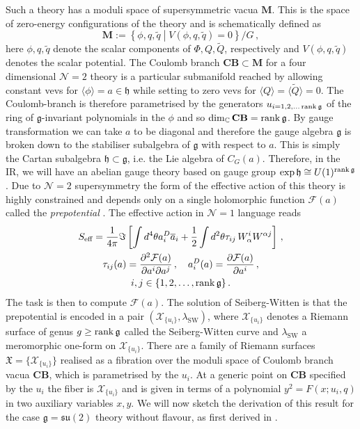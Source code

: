 \documentclass[main.tex]{subfiles}
\begin{document}
Such a theory has a moduli space of supersymmetric vacua $\mathbf{M}$.  This is the space of zero-energy configurations of the theory and is schematically defined as
\begin{equation}\label{eqn:Modspacedef}
\mathbf{M}:=\left\{\phi,q,\widetilde{q}\middle|V(\phi,q,\widetilde{q})=0\right\}/G\,,
\end{equation}
here $\phi,q,\widetilde{q}$ denote the scalar components of $\Phi,Q,\widetilde{Q}$, respectively and $V(\phi,q,\widetilde{q})$ denotes the scalar potential.
The Coulomb branch $\mathbf{CB}\subset \mathbf{M}$ for a four dimensional $\mathcal{N}=2$ theory is a particular submanifold reached by allowing constant vevs for $\langle\phi\rangle=a\in\mathfrak{h}$ while setting to zero vevs for $\langle Q\rangle=\langle\widetilde{Q}\rangle=0$.  The Coulomb-branch is therefore parametrised by the generators $u_{i=1,2,\dots\operatorname{rank}\mathfrak{g}}$ of the ring of $\mathfrak{g}$-invariant polynomials in the $\phi$ and so $\dim_{\mathbb{C}} \mathbf{CB}=\operatorname{rank}\mathfrak{g}$.  By gauge transformation we can take $a$ to be diagonal and therefore the gauge algebra $\mathfrak{g}$ is broken down to the stabiliser subalgebra of $\mathfrak{g}$ with respect to $a$.  This is simply the Cartan subalgebra $\mathfrak{h}\subset\mathfrak{g}$, i.e.  the Lie algebra of $C_{G}(a)$.  Therefore, in the IR, we will have an abelian gauge theory based on gauge group $\exp\mathfrak{h}\cong U(1)^{\operatorname{rank}\mathfrak{g}}$.  Due to $\mathcal{N}=2$ supersymmetry the form of the effective action of this theory is highly constrained and depends only on a single holomorphic function $\mathcal{F}(a)$ called the \textit{prepotential} \cite{1988PhLB..206...75S}.  The effective action in $\mathcal{N}=1$ language reads
\begin{gather}
S_{\text{eff}}=\frac{1}{4\pi}\Im\left[\int d^4\theta a^D_i\overline{a}_i+\frac{1}{2}\int d^2\theta\tau_{ij}\,W_{\alpha}^iW^{\alpha j}\right]\,,\\
 \tau_{ij}(a)=\frac{\partial^2\mathcal{F}(a)}{\partial a^i\partial a^j}\,,\quad a^D_i(a)=\frac{\partial \mathcal{F}(a)}{\partial a^i}\,,\\i,j\in\{1,2,\dots,\operatorname{rank}\mathfrak{g}\}\,.
\end{gather}
The task is then to compute $\mathcal{F}(a)$.  The solution of Seiberg-Witten is that the prepotential is encoded in a pair $(\mathcal{X}_{\{u_i\}},\lambda_{\text{SW}})$, where $\mathcal{X}_{\{u_i\}}$ denotes a Riemann surface of genus $g\geq\operatorname{rank}\mathfrak{g}$ called the Seiberg-Witten curve and $\lambda_{\text{SW}}$ a meromorphic one-form on $\mathcal{X}_{\{u_i\}}$.  There are a family of Riemann surfaces $\mathfrak{X}=\{\mathcal{X}_{\{u_i\}}\}$ realised as a fibration over the moduli space of Coulomb branch vacua $\mathbf{CB}$, which is parametrised by the $u_i$.  At a generic point on $\mathbf{CB}$ specified by the $u_i$ the fiber is $\mathcal{X}_{\{u_i\}}$ and is given in terms of a polynomial $y^2=F(x;u_i,q)$ in two auxiliary variables $x,y$.  We will now sketch the derivation of this result for the case $\mathfrak{g}=\mathfrak{su}(2)$ theory without flavour, as first derived in \cite{Seiberg:1994rs}.  
\end{document}
